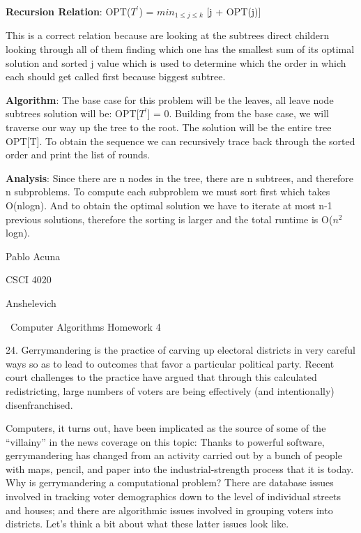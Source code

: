 \documentclass{article}
\begin{document}
\textbf{Recursion Relation}: OPT($T^{'}$) = $min_{1 \leq j \leq k}$ [j + OPT(j)] \newline

This is a correct relation because are looking at the subtrees direct childern
looking through all of them finding which one has the smallest sum of its
optimal solution and sorted j value which is used to determine which the order in which
each should get called first because biggest subtree. \newline

\textbf{Algorithm}: The base case for this problem will be the leaves, all leave
node subtrees solution will be: OPT[$T^{'}$] = 0.
Building from the base case, we will traverse our way up the tree to the root.
The solution will be the entire tree OPT[T].  To obtain the sequence we can
recursively trace back through the sorted order and print the list of rounds. \newline

\textbf{Analysis}: Since there are n nodes in the tree, there are n subtrees,
and therefore n subproblems.  To compute each subproblem we must sort first which
takes O(nlogn).  And to obtain the optimal solution we have to iterate at most
n-1 previous solutions, therefore the sorting is larger and the total runtime is
O($n^2$logn).


\clearpage

Pablo Acuna

CSCI 4020

Anshelevich

{\centering\ Computer Algorithms Homework 4 \newline\par}

24. Gerrymandering is the practice of carving up electoral districts in
very careful ways so as to lead to outcomes that favor a particular
political party. Recent court challenges to the practice have argued that
through this calculated redistricting, large numbers of voters are being
effectively (and intentionally) disenfranchised.

Computers, it turns out, have been implicated as the source of some of
the “villainy” in the news coverage on this topic: Thanks to powerful
software, gerrymandering has changed from an activity carried out by a
bunch of people with maps, pencil, and paper into the industrial-strength
process that it is today. Why is gerrymandering a computational problem?
There are database issues involved in tracking voter demographics down
to the level of individual streets and houses; and there are algorithmic
issues involved in grouping voters into districts. Let’s think a bit
about what these latter issues look like.
\end{document}
